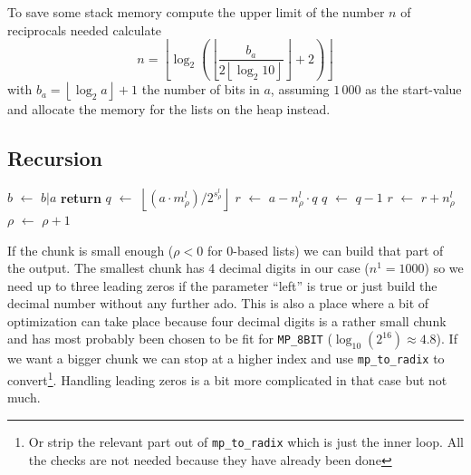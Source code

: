 \documentclass[a4paper,10pt]{article}
\newcommand*\Let[2]{\State #1 $\gets$ #2}
\newcommand{\RETURN}{\State \textbf{return} }
\providecommand{\floor}[1]{\left\lfloor#1\right\rfloor}
\DeclareMathOperator{\AND}{\wedge}
\theoremstyle{plain} %
\theoremstyle{definition}
\theoremstyle{remark}
\newcommand*{\smalltt}[1]{\small\texttt{#1}}
\begin{document}
To save some stack memory compute the upper limit of the number $n$ of reciprocals needed calculate
\begin{equation}
n = \floor{\log_2 \left( \floor{\frac{b_a}{2\floor{\log_2 10}}} + 2 \right)  }
\end{equation}
with $b_a = \floor{\log_2 a} + 1$ the number of bits in $a$, assuming $1\,000$ as the start-value and allocate the memory for the lists on the heap instead.

\subsection{Recursion}

\begin{center}
  \begin{algorithmic}[1]
      \Let{$b$}{$b | a$}
      \RETURN
    \Else
      \Let{$q$}{$\floor{\left(a\cdot m^l_\rho\right) / 2^{s^l_\rho}}$}
      \Let{$r$}{$ a - n^l_\rho \cdot q$}
        \Let{$q$}{$q - 1$}
        \Let{$r$}{$r + n^l_\rho$}
      \EndIf
      \Let{$\rho$}{$\rho + 1$}
      \If{$\left(L = 1\right) \AND \left(q = 0\right) $}
        \State {}
      \Else
        \State {}
        \State {}
      \EndIf
    \EndIf
    \EndFunction
  \end{algorithmic}
\end{center}

If the chunk is small enough ($\rho < 0$ for 0-based lists) we can build that part of the output.
The smallest chunk has 4 decimal digits in our case ($n^1 = 1000$) so we need up to three leading zeros if the parameter ``left'' is true or just build the decimal number without any further ado.
This is also a place where a bit of optimization can take place because four decimal digits is a rather small chunk and has most probably been chosen to be fit for \smalltt{MP\_8BIT} ($\log_{10}(2^{16}) \approx 4.8$).
If we want a bigger chunk we can stop at a higher index and use \smalltt{mp\_to\_radix} to convert\footnote{Or strip the relevant part out of \smalltt{mp\_to\_radix} which is just the inner loop. All the checks are not needed because they have already been done}. Handling leading zeros is a bit more complicated in that case but not much.
\end{document}
